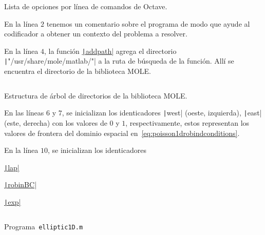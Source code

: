 \begin{problem}
\begin{listing}[ht!]
    \tiny
    \centering
    \inputminted{text}{octave-help.txt}
    \caption{Lista de opciones por línea de comandos de Octave.}
\end{listing}

En la línea $2$ tenemos un comentario sobre el programa de modo que
ayude al codificador a obtener un contexto del problema a resolver.



En la línea $4$, la función
\href{https://docs.octave.org/v9.3.0/Manipulating-the-Load-Path.html#index-addpath}{\texttt|addpath|}
agrega el directorio \texttt|"/usr/share/mole/matlab/"| a la ruta de búsqueda de la función.
Allí se encuentra el directorio de la biblioteca MOLE.

\begin{listing}[ht!]
    \tiny
    \centering
    \inputminted{text}{moledirectories.txt}
    \caption{Estructura de árbol de directorios de la biblioteca MOLE.}
\end{listing}

En las líneas $6$ y $7$, se inicializan los identicadores
\texttt|west| (oeste, izquierda),
\texttt|east| (este, derecha) con los valores de $0$ y
$1$, respectivamente, estos representan los valores de frontera del
dominio espacial en~\eqref{eq:poisson1drobindconditions}.

En la línea $10$, se inicializan los identicadores

\href{https://carlosal1015.github.io/mole_examples/api_docs/matlab/src/matlab/lap.html}{\texttt|lap|}

\href{https://carlosal1015.github.io/mole_examples/api_docs/matlab/src/matlab/robinBC.html}{\texttt|robinBC|}

\href{https://docs.octave.org/latest/Exponents-and-Logarithms.html#XREFexp}{\texttt|exp|}

\begin{listing}[ht!]
    \tiny
    \centering
    \inputminted[frame=single,framesep=10pt,linenos,firstline=1,lastline=43,highlightlines={13}]{octave}{../../examples/octave/elliptic1D.m}
    \caption{Programa~\texttt{elliptic1D.m}}
    \label{code:elliptic1D.m}
\end{listing}


\end{problem}

